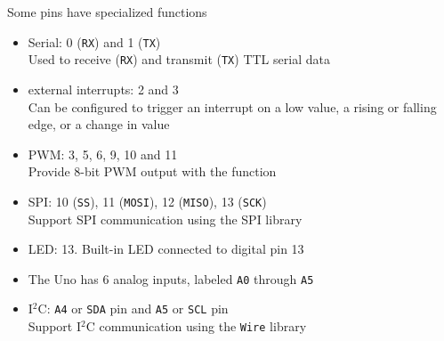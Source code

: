 \documentclass[compress]{beamer}
\begin{document}
\begin{frame}{Some pins have specialized functions}

     {
    \begin{itemize}
        \item Serial: 0 (\texttt{RX}) and 1 (\texttt{TX}) \\
                Used to receive (\texttt{RX}) and transmit (\texttt{TX}) TTL
                serial data
        \item external interrupts: 2 and 3 \\
                Can be configured to trigger an interrupt on a low value, a
                rising or falling edge, or a change in value
        \item PWM: 3, 5, 6, 9, 10 and 11 \\
                Provide 8-bit PWM output with the  function
    \end{itemize}
}
     {
        \begin{itemize}
            \item SPI: 10 (\texttt{SS}), 11 (\texttt{MOSI}), 12 (\texttt{MISO}),
                13 (\texttt{SCK}) \\
                 Support SPI communication using the SPI library
            \item LED: 13. Built-in LED connected to digital pin 13
            \item The Uno has 6 analog inputs, labeled \texttt{A0} through
                \texttt{A5}
            \item I$^2$C: \texttt{A4} or \texttt{SDA} pin and \texttt{A5} or
                \texttt{SCL} pin \\
                  Support I$^2$C communication using the \texttt{Wire} library
        \end{itemize}
    }
\end{frame}
\end{document}
